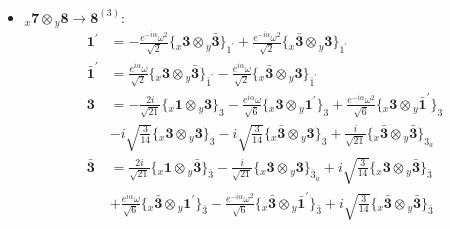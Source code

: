 \documentclass[english]{article}
\newcommand{\rep}[1]{\mathbf{#1}}
\newcommand{\repx}[2]{{}_{#2}\mathbf{#1}}
\newcommand{\subcg}[3]{\big\{ \repx{#1}{x}\otimes\repx{#2}{y}\big\}^{}_{#3}}
\begin{document}
\begin{itemize}
\begin{align*}
\end{align*}
\item $\repx{7}{x}\otimes\repx{8}{y}\to\rep{8}^{(3)}$:
\begin{align*}
\rep{1^{\prime}} & = -\frac{e^{-i \alpha } \omega ^2}{\sqrt{2}}\subcg{3}{\bar{3}}{1^{\prime}}+\frac{e^{-i \alpha } \omega ^2}{\sqrt{2}}\subcg{\bar{3}}{3}{1^{\prime}}
\\
\rep{\bar{1}^{\prime}} & = \frac{e^{i \alpha } \omega }{\sqrt{2}}\subcg{3}{\bar{3}}{\bar{1}^{\prime}}-\frac{e^{i \alpha } \omega }{\sqrt{2}}\subcg{\bar{3}}{3}{\bar{1}^{\prime}}
\\
\rep{3} & = -\frac{2 i}{\sqrt{21}}\subcg{1}{3}{3}-\frac{e^{i \alpha } \omega }{\sqrt{6}}\subcg{3}{1^{\prime}}{3}+\frac{e^{-i \alpha } \omega ^2}{\sqrt{6}}\subcg{3}{\bar{1}^{\prime}}{3} \\ 
 & -i \sqrt{\frac{3}{14}}\subcg{3}{3}{3}-i \sqrt{\frac{3}{14}}\subcg{\bar{3}}{3}{3}+\frac{i}{\sqrt{21}}\subcg{\bar{3}}{\bar{3}}{3_{a}}
\\
\rep{\bar{3}} & = \frac{2 i}{\sqrt{21}}\subcg{1}{\bar{3}}{\bar{3}}-\frac{i}{\sqrt{21}}\subcg{3}{3}{\bar{3}_{a}}+i \sqrt{\frac{3}{14}}\subcg{3}{\bar{3}}{\bar{3}} \\ 
 & +\frac{e^{i \alpha } \omega }{\sqrt{6}}\subcg{\bar{3}}{1^{\prime}}{\bar{3}}-\frac{e^{-i \alpha } \omega ^2}{\sqrt{6}}\subcg{\bar{3}}{\bar{1}^{\prime}}{\bar{3}}+i \sqrt{\frac{3}{14}}\subcg{\bar{3}}{\bar{3}}{\bar{3}}
\end{align*}
\end{itemize}
\end{document}
